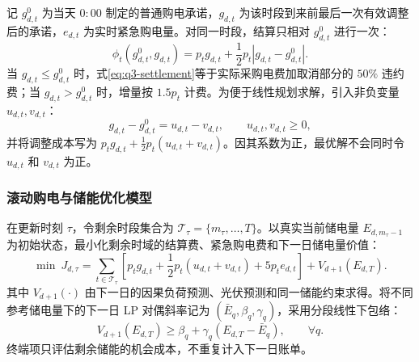 记 $g_{d,t}^{0}$ 为当天 $0{:}00$ 制定的普通购电承诺，$g_{d,t}$ 为该时段到来前最后一次有效调整后的承诺，$e_{d,t}$ 为实时紧急购电量。对同一时段，结算只相对 $g_{d,t}^{0}$ 进行一次：
\begin{equation}
\phi_t\left(g_{d,t}^{0},g_{d,t}\right)=p_tg_{d,t}+\frac{1}{2}p_t\left|g_{d,t}-g_{d,t}^{0}\right|.
\label{eq:q3-settlement}
\end{equation}
当 $g_{d,t}\leq g_{d,t}^{0}$ 时，式\eqref{eq:q3-settlement}等于实际采购电费加取消部分的 $50\%$ 违约费；当 $g_{d,t}>g_{d,t}^{0}$ 时，增量按 $1.5p_t$ 计费。为便于线性规划求解，引入非负变量 $u_{d,t},v_{d,t}$：
\begin{equation}
g_{d,t}-g_{d,t}^{0}=u_{d,t}-v_{d,t},\qquad u_{d,t},v_{d,t}\geq0,
\label{eq:q3-adjust-linearization}
\end{equation}
并将调整成本写为 $p_tg_{d,t}+\tfrac12p_t(u_{d,t}+v_{d,t})$。因其系数为正，最优解不会同时令 $u_{d,t}$ 和 $v_{d,t}$ 为正。

\subsubsection{滚动购电与储能优化模型}

在更新时刻 $\tau$，令剩余时段集合为 $\mathcal T_\tau=\{m_\tau,\ldots,T\}$。以真实当前储电量 $E_{d,m_\tau-1}$ 为初始状态，最小化剩余时域的结算费、紧急购电费和下一日储电量价值：
\begin{equation}
\min\ J_{d,\tau}=\sum_{t\in\mathcal T_\tau}\left[p_tg_{d,t}+\frac12p_t(u_{d,t}+v_{d,t})+5p_te_{d,t}\right]+V_{d+1}(E_{d,T}).
\label{eq:q3-objective}
\end{equation}
其中 $V_{d+1}(\cdot)$ 由下一日的因果负荷预测、光伏预测和同一储能约束求得。将不同参考储电量下的下一日 LP 对偶斜率记为 $(\bar E_q,\beta_q,\gamma_q)$，采用分段线性下包络：
\begin{equation}
V_{d+1}(E_{d,T})\geq \beta_q+\gamma_q(E_{d,T}-\bar E_q),\qquad \forall q.
\label{eq:q3-terminal-value}
\end{equation}
终端项只评估剩余储能的机会成本，不重复计入下一日账单。


